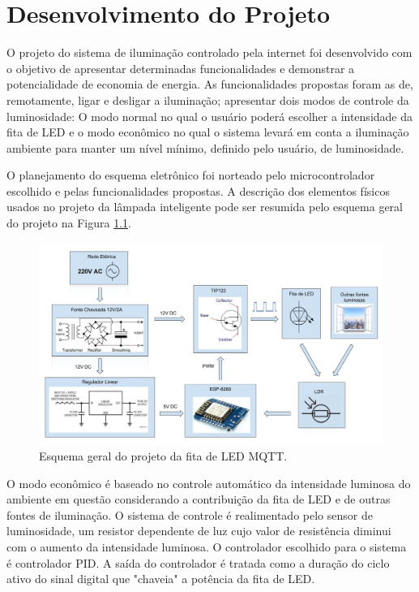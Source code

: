 \chapter{Desenvolvimento do Projeto}

O projeto do sistema de iluminação controlado pela internet foi desenvolvido com o objetivo de apresentar determinadas funcionalidades e demonstrar a potencialidade de economia de energia. As funcionalidades propostas foram as de, remotamente, ligar e desligar a iluminação; apresentar dois modos de controle da luminosidade: O modo normal no qual o usuário poderá escolher a intensidade da fita de LED e o modo econômico no qual o sistema levará em conta a iluminação ambiente para manter um nível mínimo, definido pelo usuário, de luminosidade. 

O planejamento do esquema eletrônico foi norteado pelo microcontrolador escolhido e pelas funcionalidades propostas. A descrição dos elementos físicos usados no projeto da lâmpada inteligente pode ser resumida pelo esquema geral do projeto na Figura \ref{esquema}.

\begin{figure}[ht]
    \begin{center}
    \includegraphics[width=\textwidth]{figuras/esquema_eletrico.jpg}
    \end{center}
    \caption[Esquema geral do projeto da fita de LED MQTT.]{Esquema geral do projeto da fita de LED MQTT.}
    \label{esquema}
\end{figure}

O modo econômico é baseado no controle automático da intensidade luminosa do ambiente em questão considerando a contribuição da fita de LED e de outras fontes de iluminação. O sistema de controle é realimentado pelo sensor de luminosidade, um resistor dependente de luz cujo valor de resistência diminui com o aumento da intensidade luminosa. O controlador escolhido para o sistema é controlador \acf{PID}. A saída do controlador é tratada como a duração do ciclo ativo do sinal digital que "chaveia" a potência da fita de LED.

